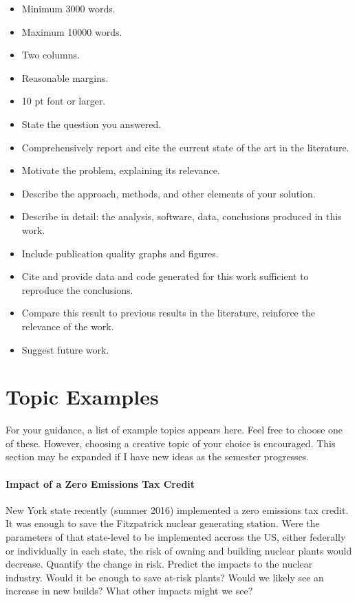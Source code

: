 \documentclass[12pts, answers]{exam}
\begin{document}
\begin{questions}
\begin{itemize}
\item Minimum 3000 words.
\item Maximum 10000 words.
\item Two columns.
\item Reasonable margins.
\item 10 pt font or larger.
\item State the question you answered.
\item Comprehensively report and cite the current state of the art in the literature.
\item Motivate the problem, explaining its relevance.
\item Describe the approach, methods, and other elements of your solution.
\item Describe in detail: the analysis, software, data, conclusions produced in this work.
\item Include publication quality graphs and figures.
\item Cite and provide data and code generated for this work sufficient to reproduce the conclusions.
\item Compare this result to previous results in the literature, reinforce the relevance of the work. 
\item Suggest future work.
\end{itemize}

\end{questions}


\section*{Topic Examples}
For your guidance, a list of example topics appears here.
Feel free to choose one of these.  However, choosing a creative topic 
of your choice is encouraged. This section may be expanded if I have new ideas 
as the semester progresses.

\paragraph{Impact of a Zero Emissions Tax Credit} New York state recently 
(summer 2016) implemented a zero emissions tax credit. It was enough to save 
the Fitzpatrick nuclear generating station. Were the parameters of that 
state-level to be implemented accross the US, either federally or individually 
in each state, the risk of owning and building nuclear plants would decrease. 
Quantify the change in risk. Predict the impacts to the nuclear industry. Would 
it be enough to save at-risk plants? Would we likely see an increase in new 
builds? What other impacts might we see?
\end{document}
